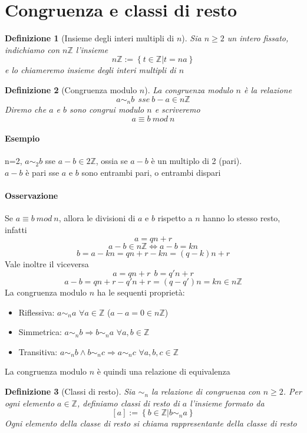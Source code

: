 \documentclass[a4paper]{report}
\newtheorem{definition}{Definizione}
\begin{document}
\section{Congruenza e classi di resto}
\begin{definition}[Insieme degli interi multipli di $n$]
    Sia $n\geq 2$ un intero fissato, indichiamo con $n\mathbb{Z}$ l'insieme
    \[
        n\mathbb{Z}:=\left\{t\in\mathbb{Z}|t=na\right\}
    \]
    e lo chiameremo insieme degli interi multipli di $n$
\end{definition}
\begin{definition}[Congruenza modulo $n$]
    La congruenza modulo $n$ è la relazione
    \[
        a\sim_n b\ \ sse\ b-a\in n\mathbb{Z}
    \]
    Diremo che $a$ e $b$ sono congrui modulo $n$ e scriveremo
    \[
        a\equiv b\ mod\ n
    \]
\end{definition}
\paragraph{Esempio}
n=2, $a\sim_2 b$ sse $a-b\in 2\mathbb{Z}$, ossia se $a-b$ è un multiplo di 2 (pari).\\
$a-b$ è pari sse $a$ e $b$ sono entrambi pari, o entrambi dispari
\paragraph{Osservazione}
Se $a\equiv b\ mod\ n$, allora le divisioni di $a$ e $b$ rispetto a $n$ hanno lo stesso resto, infatti
\[
    a=qn+r
\]
\[
    a-b\in n\mathbb{Z}\Leftrightarrow a-b=kn
\]
\[
    b=a-kn=qn+r-kn=(q-k)n+r
\]
Vale inoltre il viceversa
\[
    a=qn+r\ \ b=q'n+r
\]
\[
    a-b=qn+r-q'n+r=(q-q')n=kn\in n\mathbb{Z}
\]
La congruenza modulo $n$ ha le sequenti proprietà:
\begin{itemize}
    \item Riflessiva: $a\sim_n a$ $\forall a\in\mathbb{Z}$ ($a-a=0\in n\mathbb{Z}$)
    \item Simmetrica: $a\sim_n b\Rightarrow b\sim_n a$ $\forall a,b\in\mathbb{Z}$
    \item Transitiva: $a\sim_n b\wedge b\sim_n c\Rightarrow a\sim_n c$ $\forall a,b,c\in\mathbb{Z}$
\end{itemize}
La congruenza modulo $n$ è quindi una relazione di equivalenza
\begin{definition}[Classi di resto]
    Sia $\sim_n$ la relazione di congruenza con $n\geq 2$. Per ogni elemento $a\in\mathbb{Z}$, definiamo classi di resto di $a$ l'insieme formato da
    \[
        [a]:=\left\{b\in\mathbb{Z}|b\sim_n a\right\}
    \]
    Ogni elemento della classe di resto si chiama rappresentante della classe di resto
\end{definition}
\end{document}
